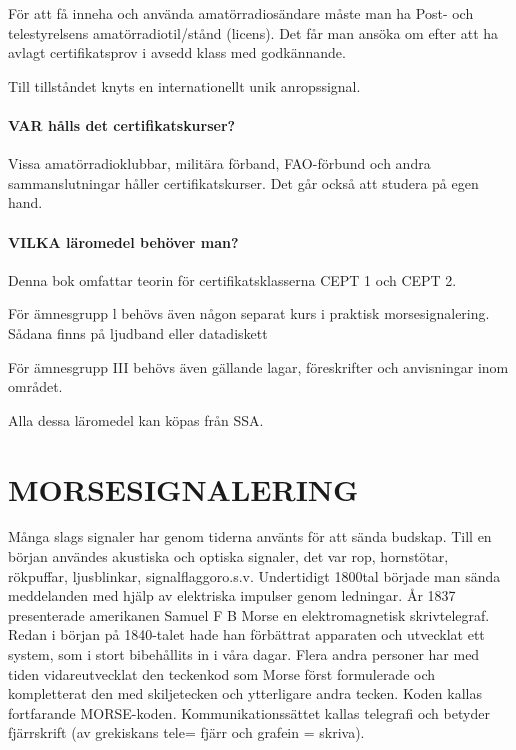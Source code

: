 \documentclass[a4paper,twoside,twocolumn,openright]{book}
\begin{document}
För att få inneha och använda amatörradiosändare måste man ha Post- och telestyrelsens
amatörradiotil/stånd (licens). Det får man ansöka om efter att ha avlagt certifikatsprov
i avsedd klass med godkännande.

Till tillståndet knyts en internationellt unik anropssignal.

\subsection*{VAR hålls det certifikatskurser?}

Vissa amatörradioklubbar, militära förband,
FAO-förbund och andra sammanslutningar
håller certifikatskurser. Det går också att
studera på egen hand.

\subsection*{VILKA läromedel behöver man?}

Denna bok omfattar teorin för certifikatsklasserna CEPT 1 och CEPT 2.

För ämnesgrupp l behövs även någon separat kurs i praktisk morsesignalering.
Sådana finns på ljudband eller datadiskett

För ämnesgrupp III behövs även gällande lagar, föreskrifter och anvisningar inom
området.

Alla dessa läromedel kan köpas från SSA.

\part{MORSESIGNALERING}

Många slags signaler har genom tiderna använts för att sända budskap. Till en början
användes akustiska och optiska signaler, det var rop, hornstötar, rökpuffar, ljusblinkar,
signalflaggoro.s.v. Undertidigt 1800tal började man sända meddelanden med hjälp av
elektriska impulser genom ledningar. År 1837 presenterade amerikanen Samuel
F B Morse en elektromagnetisk skrivtelegraf. Redan i början på 1840-talet hade han
förbättrat apparaten och utvecklat ett system, som i stort bibehållits in i våra dagar.
Flera andra personer har med tiden vidareutvecklat den teckenkod som Morse först
formulerade och kompletterat den med skiljetecken och ytterligare andra tecken. Koden
kallas fortfarande MORSE-koden. Kommunikationssättet kallas telegrafi och betyder
fjärrskrift (av grekiskans tele= fjärr och grafein = skriva).
\end{document}
